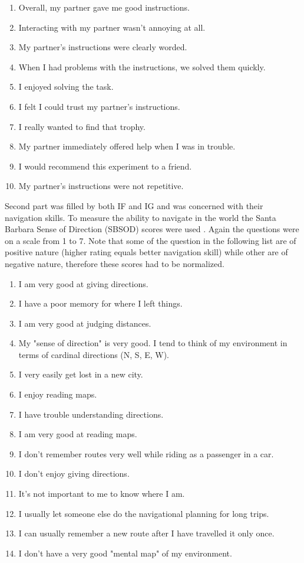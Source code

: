 \begin{enumerate}
\item
Overall, my partner gave me good instructions.
\item
Interacting with my partner wasn't annoying at all.
\item
My partner's instructions were clearly worded.
\item
When I had problems with the instructions, we solved them quickly.
\item
I enjoyed solving the task.
\item
I felt I could trust my partner's instructions.
\item
I really wanted to find that trophy.
\item
My partner immediately offered help when I was in trouble.
\item
I would recommend this experiment to a friend.
\item
My partner's instructions were not repetitive.
\end{enumerate}


Second part was filled by both IF and IG and was concerned with their navigation skills. To measure the ability to navigate in the world the Santa Barbara Sense of Direction (SBSOD) scores were used \citep{hegarty2002development}. Again the questions were on a scale from 1 to 7. Note that some of the question in the following list are of positive nature (higher rating equals better navigation skill) while other are of negative nature, therefore these scores had to be normalized.

\begin{enumerate}
\item
I am very good at giving directions.
\item
I have a poor memory for where I left things.
\item
I am very good at judging distances.
\item
My "sense of direction" is very good.
I tend to think of my environment in terms of cardinal directions (N, S, E, W).
\item
I very easily get lost in a new city.
\item
I enjoy reading maps.
\item
I have trouble understanding directions.
\item
I am very good at reading maps.
\item
I don't remember routes very well while riding as a passenger in a car.
\item
I don't enjoy giving directions.
\item
It's not important to me to know where I am.
\item
I usually let someone else do the navigational planning for long trips.
\item
I can usually remember a new route after I have travelled it only once.
\item
I don't have a very good "mental map" of my environment.
\end{enumerate}


